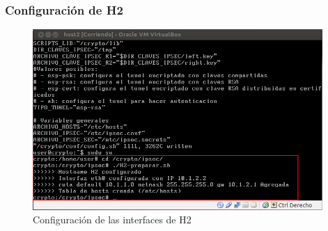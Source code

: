 \documentclass[a4paper,10pt]{article}
\begin{document}
			\subsubsection{Configuraci\'on de H2}
	\begin{figure}[H]
		\centering
		\includegraphics[width=11cm]{Imagenes/prepararH2.png}
		\caption{Configuraci\'on de las interfaces de H2} \label{img017}
	\end{figure}	
	
\end{document}
